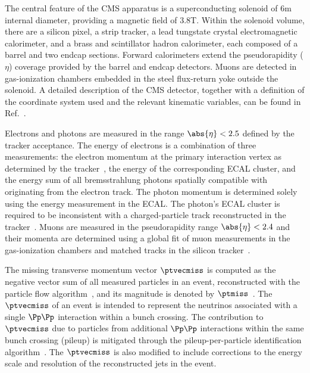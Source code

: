 The central feature of the CMS apparatus is a superconducting solenoid of 6\unit{m} internal diameter, providing a magnetic field of 3.8\unit{T}. Within the solenoid volume, there are a silicon pixel, a strip tracker, a lead tungstate crystal electromagnetic calorimeter, and a brass and scintillator hadron calorimeter, each composed of a barrel and two endcap sections. Forward calorimeters extend the pseudorapidity ($\eta$) coverage provided by the barrel and endcap detectors. Muons are detected in gas-ionization chambers embedded in the steel flux-return yoke outside the solenoid. A detailed description of the CMS detector, together with a definition of the coordinate system used and the relevant kinematic variables, can be found in Ref.~\cite{Chatrchyan:2008zzk}.

Electrons and photons are measured in the range $\abs{\eta} < 2.5$ defined by the tracker acceptance. The energy of electrons is a combination of three measurements: the electron momentum at the primary interaction vertex as determined by the tracker~\cite{pvdefinition}, the energy of the corresponding ECAL cluster, and the energy sum of all bremsstrahlung photons spatially compatible with originating from the electron track. The photon momentum is determined solely using the energy measurement in the ECAL. The photon's ECAL cluster is required to be inconsistent with a charged-particle track reconstructed in the tracker~\cite{cmscollaboration2020electron}. Muons are measured in the pseudorapidity range $\abs{\eta} < 2.4$ and their momenta are determined using a global fit of muon measurements in the gas-ionization chambers and matched tracks in the silicon tracker~\cite{Sirunyan:2018}.

The missing transverse momentum vector $\ptvecmiss$ is computed as the negative vector \pt sum of all measured particles in an event, reconstructed with the particle flow algorithm~\cite{CMS-PRF-14-001}, and its magnitude is denoted by $\ptmiss$~\cite{Sirunyan_2019}. The $\ptvecmiss$ of an event is intended to represent the neutrinos associated with a single $\Pp \Pp$ interaction within a bunch crossing. The contribution to $\ptvecmiss$ due to particles from additional $\Pp \Pp$ interactions within the same bunch crossing (pileup) is mitigated through the pileup-per-particle identification algorithm~\cite{Bertolini:2014bba,cmspuppi}. The $\ptvecmiss$ is also modified to include corrections to the energy scale and resolution of the reconstructed jets in the event.


